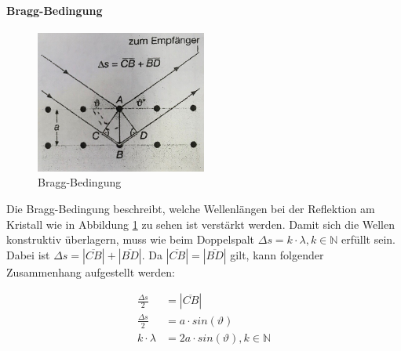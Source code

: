 \documentclass[a4paper]{article}
\begin{document}
				\paragraph{Bragg-Bedingung}
				\begin{figure}[H]
					\centering
					\includegraphics[width=0.5\textwidth]{img/Interferenz_am_Kristall.jpg}
					\caption{Bragg-Bedingung}
					\label{img:Interferenz_am_Kristall}
				\end{figure}
				\noindent Die Bragg-Bedingung beschreibt, welche Wellenlängen bei der Reflektion am Kristall wie in Abbildung \ref{img:Interferenz_am_Kristall} zu sehen ist verstärkt werden. Damit sich die Wellen konstruktiv überlagern, muss wie beim Doppelspalt $\Delta s = k\cdot \lambda, k\in \mathbb{N}$ erfüllt sein. Dabei ist $\Delta s = |\overline{CB}| + |\overline{BD}|$. Da $|\overline{CB}| = |\overline{BD}|$ gilt, kann folgender Zusammenhang aufgestellt werden:
				
				\begin{equation}
					\begin{aligned}
						\frac{\Delta s}{2} &= |\overline{CB}|\\
						\frac{\Delta s}{2} &= a\cdot sin(\vartheta)\\
						k\cdot \lambda &= 2a\cdot sin(\vartheta), k\in \mathbb{N}
					\end{aligned}
				\end{equation}
			
\end{document}
